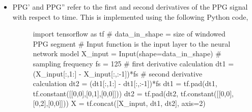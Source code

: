 \begin{itemize}
\item PPG' and PPG'' refer to the first and second derivatives of the PPG signal with respect to time. This is implemented using the following Python code,
\begin{figure}[H]
    \begin{python}
        import tensorflow as tf
        # data_in_shape = size of windowed PPG segment
        # Input function is the input layer to the neural network model
        X_input = Input(shape=data_in_shape)
        # sampling frequency        
        fs = 125
        # first derivative calculation                                    
        dt1 = (X_input[:,1:] - X_input[:,:-1])*fs
        # second derivative calculation   
        dt2 = (dt1[:,1:] - dt1[:,:-1])*fs           
        dt1 = tf.pad(dt1, tf.constant([[0,0],[0,1],[0,0]]))
        dt2 = tf.pad(dt2, tf.constant([[0,0],[0,2],[0,0]]))
        X = tf.concat([X_input, dt1, dt2], axis=2)
        

\end{python}
\end{figure}
\end{itemize}
